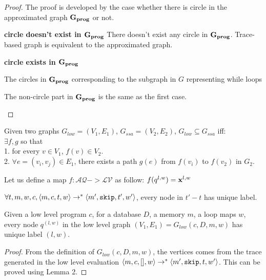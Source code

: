 \documentclass[a4paper,11pt]{article}
\begin{document}
{\begin{proof}
%
The proof is developed by the case whether there is circle in the approximated graph $\bf{G_{prog}}$ or not.
\begin{mainitem}
	\item
	\textbf{circle doesn't exist in $\bf{G_{prog}}$}
	There doesn't exist any circle in $\bf{G_{prog}}$.
	Trace-based graph is equivalent to the approximated graph.
%
	\item
	\textbf{circle exists in $\bf{G_{prog}}$}
	\begin{enumsub}
		\item
		The circles in $\bf{G_{prog}}$ corresponding to the subgraph in $G$ representing while loops 
		\item
		The non-circle part in $\bf{G_{prog}}$ is the same as the first case.
	\end{enumsub}
\end{mainitem}
\end{proof}
}

\begin{defn}
[Subgraph]
Given two graphs $G_{low} = (V_1, E_1)$, $G_{ssa} = (V_2, E_2)$, $G_{low} \subseteq G_{ssa}$ iff:\\
$\exists f, g$ so that \\
1. for every $v \in V_1$, $f(v) \in V_2$. 
\\
2. $\forall e=(v_i, v_j) \in E_1$, there exists a path $g(e)$ from $f(v_i)$ to $f(v_2)$ in $G_2$.
\end{defn}
%
%
\begin{defn}
\label{lem:vertexmap}
Let us define a map $f: \mathcal{AQ} -> \mathcal{LV} $ as follow:
$f(q^{l,w}) = \mathbf{{x}}^{l,w}$ 
\end{defn}

\begin{lem}
 $\forall t,m,w,c, \langle m, c, t, w \rangle \to^{*} \langle m', \mathtt{skip}, t', w' \rangle$, every node in $t'-t$ has unique label.
\end{lem}

\begin{lem}
Given a low level program $c$, for a database $D$, a memory $m$, a loop maps $w$, every node $q^{(l,w)}$ in the low level graph $(V_1, E_1) = G_{low}(c, D, m,w)$ has unique label $(l,w)$. 
\end{lem}
\begin{proof}
 From the definition of $G_{low}(c, D, m,w)$, the vertices comes from the trace generated in the low level evaluation $ \langle m,c, [], w  \rangle \to^{*} \langle m', \mathtt{skip}, t,w' \rangle$.
  This can be proved using Lemma 2.
\end{proof}
\end{document}
